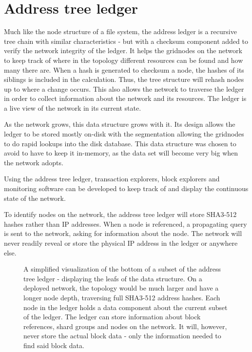 \documentclass[10pt,a4paper,final]{article}
\begin{document}
\section{Address tree ledger}
\label{section:ledger}
Much like the node structure of a file system, the address ledger is a recursive tree chain with similar characteristics - but with a checksum component added to verify the network integrity of the ledger. It helps the \glspl{gridnode} on the network to keep track of where in the topology different resources can be found and how many there are. When a hash is generated to checksum a node, the hashes of its siblings is included in the calculation. Thus, the tree structure will rehash nodes up to where a change occurs. This also allows the network to traverse the ledger in order to collect information about the network and its resources. The ledger is a live view of the network in its current state.

As the network grows, this data structure grows with it. Its design allows the ledger to be stored mostly on-disk with the segmentation allowing the \glspl{gridnode} to do rapid lookups into the disk database. This data structure was chosen to avoid to have to keep it in-memory, as the data set will become very big when the network adopts. 

Using the address tree ledger, transaction explorers, block explorers and monitoring software can be developed to keep track of and display the continuous state of the network.

To identify nodes on the network, the address tree ledger will store SHA3-512 hashes rather than IP addresses. When a node is referenced, a propagating query is sent to the network, asking for information about the node. The network will never readily reveal or store the physical IP address in the ledger or anywhere else.

\begin{figure}[H]
\centering
{}
\caption{A simplified visualization of the bottom of a subset of the address tree ledger - displaying the leafs of the data structure. On a deployed network, the topology would be much larger and have a longer node depth, traversing full SHA3-512 address hashes. Each node in the ledger holds a data component about the current subset of the ledger. The ledger can store information about block references, shard groups and nodes on the network. It will, however, never store the actual block data - only the information needed to find said block data.}
\end{figure}
\end{document}
